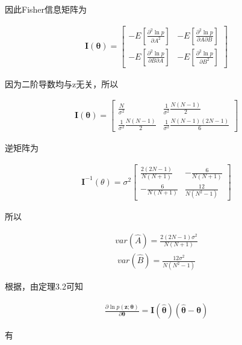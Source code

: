 \documentclass[fontset=windows]{article}
\numberwithin{figure}{section}
\begin{document}
因此Fisher信息矩阵为

\begin{align*}
    \mathbf{I}(\boldsymbol{\theta})=
    \begin{bmatrix}
        -E[\frac{\partial^2 \ln p}{\partial A^2}]          & -E[\frac{\partial^2 \ln p}{\partial A\partial B}] \\
        -E[\frac{\partial^2 \ln p}{\partial B \partial A}] & -E[\frac{\partial^2 \ln p}{\partial B^2}]
    \end{bmatrix}
\end{align*}

因为二阶导数均与z无关，所以

\begin{align*}
    \mathbf{I}(\boldsymbol{\theta})=
    \begin{bmatrix}
        \frac{N}{\sigma^2}                 & \frac{1}{\sigma^2}\frac{N(N-1)}{2}       \\
        \frac{1}{\sigma^2}\frac{N(N-1)}{2} & \frac{1}{\sigma^2}\frac{N(N-1)(2N-1)}{6}
    \end{bmatrix}
\end{align*}

逆矩阵为

\begin{align*}
    \mathbf{I}^{-1}(\theta)=\sigma^2
    \begin{bmatrix}
        \frac{2(2N-1)}{N(N+1)} & -\frac{6}{N(N+1)}   \\
        -\frac{6}{N(N+1)}      & \frac{12}{N(N^2-1)}
    \end{bmatrix}
\end{align*}

所以

\begin{align*}
    var(\hat{A})=\frac{2(2N-1)\sigma^2}{N(N+1)}
\end{align*}
\begin{align*}
    var(\hat{B})=\frac{12\sigma^2}{N(N^2-1)}
\end{align*}

根据，由定理3.2可知

\begin{align*}
    \frac{\partial \ln p(\mathbf{z};\boldsymbol{\theta})}{\partial \boldsymbol{\theta}}=
    \mathbf{I}(\hat{\boldsymbol{\theta}})(\hat{\boldsymbol{\theta}}-\boldsymbol{\theta})
\end{align*}

有
\end{document}
